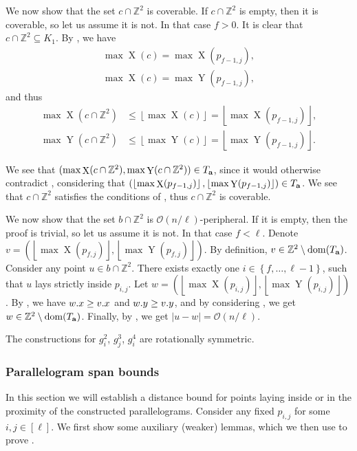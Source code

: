\documentclass[11pt]{article}
\newcommand{\Z}{\mathbb{Z}}
\renewcommand{\O}{\mathcal{O}}
\newcommand{\set}[1]{\left\lbrace #1 \right\rbrace}
\newcommand{\floor}[1]{\left\lfloor #1 \right\rfloor}
\newcommand{\eq}[1]{\begin{align*} #1 \end{align*}}
\theoremstyle{plain}
\theoremstyle{definition}
\theoremstyle{remark}
\DeclareMathOperator*{\X}{X}
\DeclareMathOperator*{\Y}{Y}
\begin{document}
We now show that the set $c \cap \Z^2$ is coverable.
If $c \cap \Z^2$ is empty, then it is coverable, so let us assume it is not.
In that case $f > 0$.
It is clear that $c \cap \Z^2 \subseteq K_1$.
By , we have 
\eq{
	\max \X(c) = \max \X(p_{f - 1, j}), \\
	\max \X(c) = \max \Y(p_{f - 1, j}),
}
and thus
\eq{
	\max \X(c \cap \Z^2) &\le \floor{\max \X(c)} = \floor{\max \X(p_{f - 1, j})}, \\
	\max \Y(c \cap \Z^2) &\le \floor{\max \Y(c)} = \floor{\max \Y(p_{f - 1, j})}.
}

We see that $(\max \X(c \cap \Z^2), \max \Y(c \cap \Z^2)) \in \Ta$, since it would otherwise contradict ,
considering that
$(\floor{\max \X(p_{f - 1, j})}, \floor{\max \Y(p_{f - 1, j})}) \in \Ta$.
We see that $c \cap \Z^2$ satisfies the conditions of , thus $c \cap \Z^2$ is coverable.

We now show that the set $b \cap \Z^2$ is $\O(n / \ell)$-peripheral.
If it is empty, then the proof is trivial, so let us assume it is not.
In that case $f < \ell$.
Denote $v = (\floor{\max \X(p_{f, j})}, \floor{\max \Y(p_{f, j})})$.
By definition, $v \in \Z^2 \setminus \d{\Ta}$.
Consider any point $u \in b \cap \Z^2$.
There exists exactly one $i \in \set{f, \dots, \ell - 1}$, such that $u$ lays strictly inside $p_{i, j}$.
Let $w = (\floor{\max \X(p_{i, j})}, \floor{\max \Y(p_{i, j})})$.
By , we have $w.x \ge v.x$ and $w.y \ge v.y$, and by considering ,
we get $w \in \Z^2 \setminus \d{\Ta}$.
Finally, by , we get $|u - w| = \O(n / \ell)$.

The constructions for $g^2_i$, $g^3_j$, $g^4_i$ are rotationally symmetric.


\subsubsection{Parallelogram span bounds} \label{distance_bound_lemma_proof}

In this section we will establish a distance bound for points laying inside or in the proximity of the constructed parallelograms.
Consider any fixed $p_{i, j}$ for some $i, j \in [\ell]$.
We first show some auxiliary (weaker) lemmas, which we then use to prove .
\end{document}
